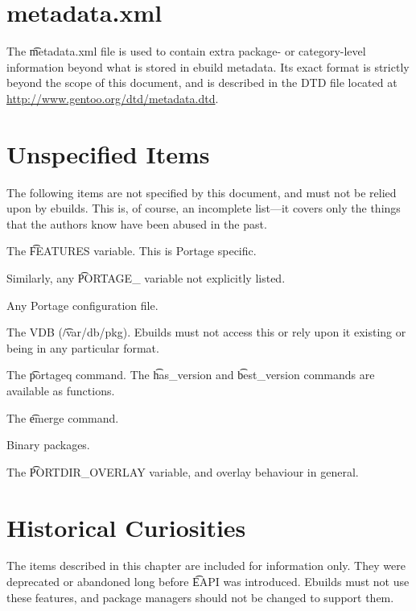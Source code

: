 \appendix

\chapter{metadata.xml}
\label{sec:metadata-xml}

The \t{metadata.xml} file is used to contain extra package- or category-level information beyond
what is stored in ebuild metadata. Its exact format is strictly beyond the scope of this document,
and is described in the DTD file located at \url{http://www.gentoo.org/dtd/metadata.dtd}.

\chapter{Unspecified Items}

The following items are not specified by this document, and must not be relied upon by ebuilds.
This is, of course, an incomplete list---it covers only the things that the authors know have
been abused in the past.

\begin{compactitem}
\item The \t{FEATURES} variable. This is Portage specific.
\item Similarly, any \t{PORTAGE\_} variable not explicitly listed.
\item Any Portage configuration file.
\item The VDB (\t{/var/db/pkg}). Ebuilds must not access this or rely upon it existing or being
    in any particular format.
\item The \t{portageq} command. The \t{has\_version} and \t{best\_version} commands are
    available as functions.
\item The \t{emerge} command.
\item Binary packages.
\item The \t{PORTDIR\_OVERLAY} variable, and overlay behaviour in general.
\end{compactitem}

\chapter{Historical Curiosities}

The items described in this chapter are included for information only. They were deprecated or
abandoned long before \t{EAPI} was introduced. Ebuilds must not use these features, and package
managers should not be changed to support them.

